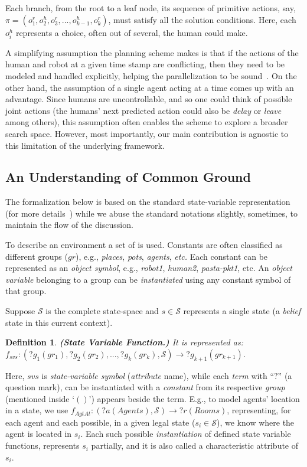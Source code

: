 \documentclass[letterpaper]{article} %
\newtheorem{definition}{Definition}
\begin{document}
Each branch, from the root to a leaf node, its sequence of primitive actions, say,  $\pi=(o_1^r,o_2^h,o_3^r,...,o_{k-1}^h,o_k^r)$, must satisfy all the solution conditions. 
Here, each $o_i^h$ represents a choice, often out of several, the human could make.

A simplifying assumption the planning scheme makes is that if the actions of the human and robot at a given time stamp are conflicting, then they need to be modeled and handled explicitly, helping the parallelization to be sound~\cite{CrosbyJR14,ShekharB20}.
On the other hand, the assumption of a single agent acting at a time comes up with an advantage. Since humans are uncontrollable, and so one could think of possible joint actions (the humans' next predicted action could also be \textit{delay} or \textit{leave} among others), this assumption often enables the scheme to explore a broader search space. 
However, most importantly, our main contribution is agnostic to this limitation of the underlying framework.

\subsection{An Understanding of Common Ground}
The formalization below is based on the standard state-variable representation (for more details~\cite{naubooks0014222}) while we abuse the standard notations slightly, sometimes, to maintain the flow of the discussion.

To describe an environment a set of  is used. 
Constants are often classified as different groups ($gr$), e.g., \textit{places}, \textit{pots}, \textit{agents}, \textit{etc.} 
Each constant can be represented as an \textit{object symbol}, e.g., \textit{robot1}, \textit{human2}, \textit{pasta-pkt1}, etc. 
An \textit{object variable} belonging to a group can be \textit{instantiated} using any constant symbol of that group.



Suppose $\mathcal{S}$ is the complete state-space and $s \in \mathcal{S}$ represents a single state (a \textit{belief} state in this current context).  

\begin{definition}\label{def:svf}
\textbf{(State Variable Function.)} It is represented as: $f_{svs}:(?g_1 (gr_1), ?g_2 (gr_2), ..., ?g_k (gr_k),\mathcal{S})\rightarrow ?g_{k+1} (gr_{k+1})$. 
\end{definition}
Here, $svs$ is \textit{state-variable symbol} (\textit{attribute} name), while each \textit{term} with ``$?$'' (a question mark), can be instantiated with a \textit{constant} from its respective \textit{group} (mentioned inside `$()$') appears beside the term. 
E.g., to model agents' location in a state, we use $f_{\textit{AgtAt}}:(?a (Agents), \mathcal{S}) \rightarrow ?r (Rooms)$, representing, for each agent and each possible, in a given legal state ($s_i \in \mathcal{S}$), we know where the agent is located in $s_i$. 
Each such possible \textit{instantiation} of defined state variable functions, represents $s_i$ partially, and it is also called a characteristic attribute of $s_i$.     
\end{document}
